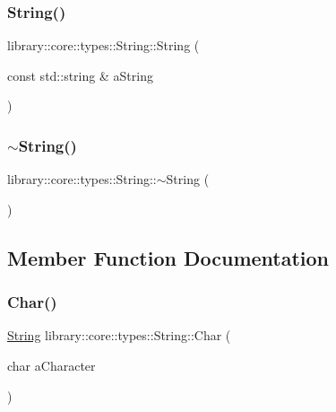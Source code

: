 \subsubsection{\texorpdfstring{String()}{String()}\hspace{0.1cm}{\footnotesize\ttfamily [2/2]}}
{\footnotesize\ttfamily library\+::core\+::types\+::\+String\+::\+String (\begin{DoxyParamCaption}\item[{const std\+::string \&}]{a\+String }\end{DoxyParamCaption})}

\mbox{\label{classlibrary_1_1core_1_1types_1_1_string_a97f9b0024a58372a0281b25e2811f3bf}} 
\subsubsection{\texorpdfstring{$\sim$\+String()}{~String()}}
{\footnotesize\ttfamily library\+::core\+::types\+::\+String\+::$\sim$\+String (\begin{DoxyParamCaption}{ }\end{DoxyParamCaption})}



\subsection{Member Function Documentation}
\mbox{\label{classlibrary_1_1core_1_1types_1_1_string_abbc5a795da1a72d1456ba4950e62602c}} 
\subsubsection{\texorpdfstring{Char()}{Char()}}
{\footnotesize\ttfamily \hyperlink{classlibrary_1_1core_1_1types_1_1_string}{String} library\+::core\+::types\+::\+String\+::\+Char (\begin{DoxyParamCaption}\item[{char}]{a\+Character }\end{DoxyParamCaption})\hspace{0.3cm}{\ttfamily [static]}}


